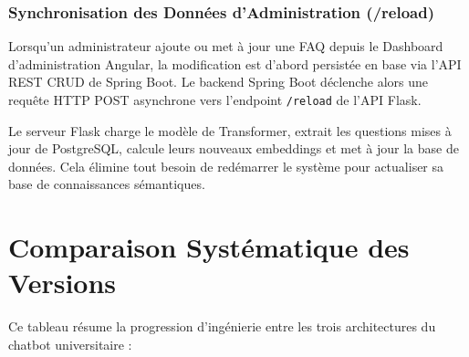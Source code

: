 \documentclass[11pt,a4paper]{article}
\begin{document}
\subsubsection{Synchronisation des Données d'Administration (/reload)}
Lorsqu'un administrateur ajoute ou met à jour une FAQ depuis le Dashboard d'administration Angular, la modification est d'abord persistée en base via l'API REST CRUD de Spring Boot. Le backend Spring Boot déclenche alors une requête HTTP POST asynchrone vers l'endpoint \texttt{/reload} de l'API Flask. 

Le serveur Flask charge le modèle de Transformer, extrait les questions mises à jour de PostgreSQL, calcule leurs nouveaux embeddings et met à jour la base de données. Cela élimine tout besoin de redémarrer le système pour actualiser sa base de connaissances sémantiques.

\clearpage

\section[Comparaison des Versions]{Comparaison Systématique des Versions}

Ce tableau résume la progression d'ingénierie entre les trois architectures du chatbot universitaire :
\end{document}
